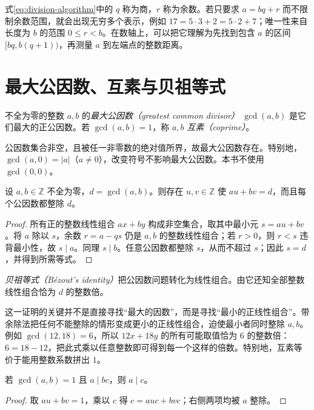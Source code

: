 式\eqref{eq:division-algorithm}中的 $q$ 称为商，$r$ 称为余数。若只要求 $a=bq+r$ 而不限制余数范围，就会出现无穷多个表示，例如 $17=5\cdot3+2=5\cdot2+7$；唯一性来自长度为 $b$ 的范围 $0\le r<b$。在数轴上，可以把它理解为先找到包含 $a$ 的区间 $[bq,b(q+1))$，再测量 $a$ 到左端点的整数距离。

\section{最大公因数、互素与贝祖等式}

\begin{definition}
不全为零的整数 $a,b$ 的\emph{最大公因数（greatest common divisor）} $\gcd(a,b)$ 是它们最大的正公因数。若 $\gcd(a,b)=1$，称 $a,b$ \emph{互素（coprime）}。
\end{definition}

公因数集合非空，且被任一非零数的绝对值所界，故最大公因数存在。特别地，$\gcd(a,0)=|a|$（$a\ne0$），改变符号不影响最大公因数。本书不使用 $\gcd(0,0)$。

\begin{theorem}[贝祖等式]
\label{thm:bezout}
设 $a,b\in\mathbb Z$ 不全为零，$d=\gcd(a,b)$。则存在 $u,v\in\mathbb Z$ 使 $au+bv=d$，而且每个公因数都整除 $d$。
\end{theorem}
\begin{proof}
所有正的整数线性组合 $ax+by$ 构成非空集合，取其中最小元 $s=au+bv$。将 $a$ 除以 $s$，余数 $r=a-qs$ 仍是 $a,b$ 的整数线性组合；若 $r>0$，则 $r<s$ 违背最小性，故 $s\mid a$。同理 $s\mid b$。任意公因数都整除 $s$，从而不超过 $s$；因此 $s=d$，并得到所需等式。
\end{proof}

\emph{贝祖等式（Bézout's identity）}把公因数问题转化为线性组合。由它还知全部整数线性组合恰为 $d$ 的整数倍。

这一证明的关键并不是直接寻找“最大的因数”，而是寻找“最小的正线性组合”。带余除法把任何不能整除的情形变成更小的正线性组合，迫使最小者同时整除 $a,b$。例如 $\gcd(12,18)=6$，所以 $12x+18y$ 的所有可能取值恰为 $6$ 的整数倍：$6=18-12$，把此式乘以任意整数即可得到每一个这样的倍数。特别地，互素等价于能用整数系数拼出 $1$。

\begin{corollary}[互素消去]
\label{cor:coprime-cancellation}
若 $\gcd(a,b)=1$ 且 $a\mid bc$，则 $a\mid c$。
\end{corollary}
\begin{proof}
取 $au+bv=1$，乘以 $c$ 得 $c=auc+bvc$；右侧两项均被 $a$ 整除。
\end{proof}

